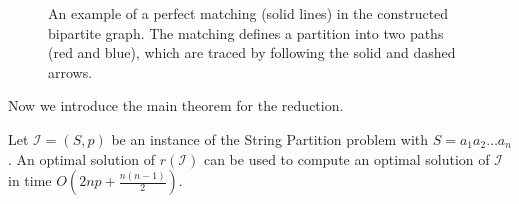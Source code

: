 \begin{example}
\begin{figure}[H]
        \caption{An example of a perfect matching (solid lines) in the constructed bipartite graph. The matching defines a partition into two paths (red and blue), which are traced by following the solid and dashed arrows.}
        \label{fig:example_bipartite_read}
    \end{figure}
\end{example}

Now we introduce the main theorem for the reduction.

\begin{theorem}
    Let $\mathcal{I}=(S,p)$ be an instance of the String Partition problem with $S=a_1a_2\dots a_n$. An optimal solution of $r(\mathcal{I})$ can be used to compute an optimal solution of $\mathcal{I}$ in time $O(2np + \frac{n(n-1)}{2})$.
\end{theorem}

